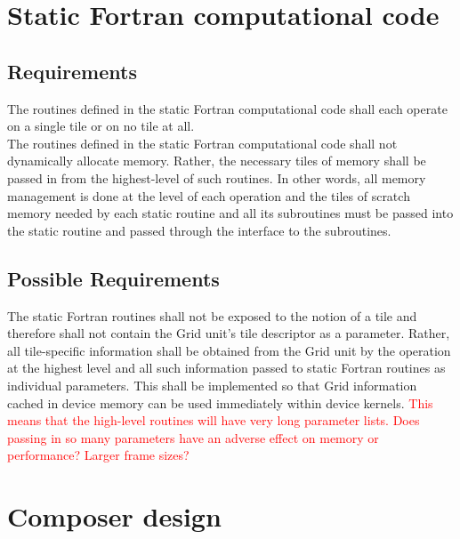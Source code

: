 \documentclass{article}
\begin{document}
\section{Static Fortran computational code}
\subsection{Requirements}
The routines defined in the static Fortran computational code shall each operate
on a single tile or on no tile at all.\\

The routines defined in the static Fortran computational code shall not
dynamically allocate memory.  Rather, the necessary tiles of memory shall be
passed in from the highest-level of such routines.  In other words, all memory
management is done at the level of each operation and the tiles of scratch
memory needed by each static routine and all its subroutines must be passed into
the static routine and passed through the interface to the subroutines.

\subsection{Possible Requirements}
The static Fortran routines shall not be exposed to the notion of a tile and
therefore shall not contain the Grid unit's tile descriptor as a parameter.
Rather, all tile-specific information shall be obtained from the Grid unit by
the operation at the highest level and all such information passed to static
Fortran routines as individual parameters.  This shall be implemented so that
Grid information cached in device memory can be used immediately within device
kernels.  \textcolor{red}{This means that the high-level routines will have very
long parameter lists.  Does passing in so many parameters have an adverse effect
on memory or performance?  Larger frame sizes?}

\section{Composer design}
\end{document}
